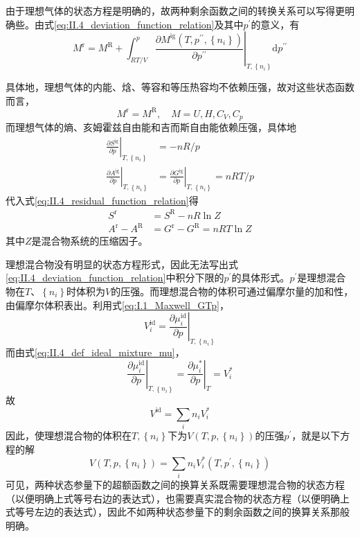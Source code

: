 \documentclass[main.tex]{subfiles}
\begin{document}
由于理想气体的状态方程是明确的，故两种剩余函数之间的转换关系可以写得更明确些。由式\eqref{eq:II.4_deviation_function_relation}及其中$p^\prime$的意义，有
\begin{equation}\label{eq:II.4_residual_function_relation}
  M^\text{r}=M^\text{R}+\int_{RT/V}^p\left.\frac{\partial M^\text{ig}\left(T,p^{\prime\prime},\left\{n_i\right\}\right)}{\partial p^{\prime\prime}}\right|_{T,\left\{n_i\right\}}\mathrm{d}p^{\prime\prime}
\end{equation}

具体地，理想气体的内能、焓、等容和等压热容均不依赖压强，故对这些状态函数而言，
\[M^\text{r}=M^\text{R},\quad M=U,H,C_V,C_p\]
而理想气体的熵、亥姆霍兹自由能和吉而斯自由能依赖压强，具体地
\begin{align*}
  \left.\frac{\partial S^\text{ig}}{\partial p}\right|_{T,\left\{n_i\right\}} & =-nR/p                                                                             \\
  \left.\frac{\partial A^\text{ig}}{\partial p}\right|_{T,\left\{n_i\right\}} & =\left.\frac{\partial G^\text{ig}}{\partial p}\right|_{T,\left\{n_i\right\}}=nRT/p
\end{align*}
代入式\eqref{eq:II.4_residual_function_relation}得
\begin{align*}
  S^\text{r}            & =S^\text{R}-nR\ln Z             \\
  A^\text{r}-A^\text{R} & =G^\text{r}-G^\text{R}=nRT\ln Z
\end{align*}
其中$Z$是混合物系统的压缩因子。

理想混合物没有明显的状态方程形式，因此无法写出式\eqref{eq:II.4_deviation_function_relation}中积分下限的$p^\prime$的具体形式。$p^\prime$是理想混合物在$T$、$\left\{n_i\right\}$时体积为$V$的压强。而理想混合物的体积可通过偏摩尔量的加和性，由偏摩尔体积表出。利用式\eqref{eq:I.1_Maxwell_GTp}，
\[V_i^\text{id}=\left.\frac{\partial \mu_i^\text{id}}{\partial p}\right|_{T,\left\{n_i\right\}}\]
而由式\eqref{eq:II.4_def_ideal_mixture_mu}，
\[\left.\frac{\partial \mu_i^\text{id}}{\partial p}\right|_{T,\left\{n_i\right\}}=\left.\frac{\partial\mu^*_i}{\partial p}\right|_T=V_i^*\]
故
\[V^\text{id}=\sum_in_iV_i^*\]
因此，使理想混合物的体积在$T,\left\{n_i\right\}$下为$V\left(T,p,\left\{n_i\right\}\right)$的压强$p^\prime$，就是以下方程的解
\[V\left(T,p,\left\{n_i\right\}\right)=\sum_in_iV_i^*\left(T,p^\prime,\left\{n_i\right\}\right)\]
可见，两种状态参量下的超额函数之间的换算关系既需要理想混合物的状态方程（以便明确上式等号右边的表达式），也需要真实混合物的状态方程（以便明确上式等号左边的表达式），因此不如两种状态参量下的剩余函数之间的换算关系那般明确。
\end{document}
